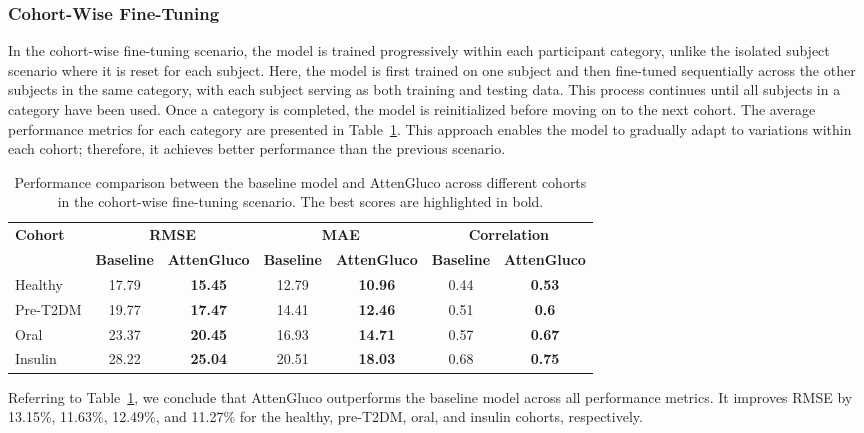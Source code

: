 \subsubsection{Cohort-Wise Fine-Tuning}
In the  cohort-wise fine-tuning scenario, the model is trained progressively within each participant category, unlike the isolated subject scenario where it is reset for each subject. Here, the model is first trained on one subject and then fine-tuned sequentially across the other subjects in the same category, with each subject serving as both training and testing data. This process continues until all subjects in a category have been used. Once a category is completed, the model is reinitialized before moving on to the next cohort. The average performance metrics for each category are presented in Table~\ref{tab:performance}. This approach enables the model to gradually adapt to variations within each cohort; therefore, it achieves better performance than the previous scenario.

\begin{table}[h]
    \centering
    \renewcommand{\arraystretch}{1.2} %
    \setlength{\tabcolsep}{6pt} %
    \captionsetup{justification=centering, font=small} %
    \caption{Performance comparison between the baseline model and AttenGluco across different cohorts in the cohort-wise fine-tuning scenario. The best scores are highlighted in bold.}
    \label{tab:performance}
    
    \begin{adjustbox}{max width=\columnwidth}
    \begin{tabular}{|l|cc|cc|cc|}
        \hline
        \multirow{2}{*}{\textbf{Cohort}} & \multicolumn{2}{c|}{\textbf{RMSE}} & \multicolumn{2}{c|}{\textbf{MAE}} & \multicolumn{2}{c|}{\textbf{Correlation}} \\
        & \textbf{Baseline} & \textbf{AttenGluco} & \textbf{Baseline} & \textbf{AttenGluco} & \textbf{Baseline} & \textbf{AttenGluco} \\
        \hline
        Healthy      & 17.79  & \textbf{15.45}   & 12.79  & \textbf{10.96}  & 0.44  & \textbf{0.53} \\
        Pre-T2DM & 19.77  & \textbf{17.47}   & 14.41  & \textbf{12.46}  & 0.51  & \textbf{0.6} \\
        Oral         & 23.37  & \textbf{20.45}   & 16.93  & \textbf{14.71}  & 0.57  & \textbf{0.67} \\
        Insulin      & 28.22  & \textbf{25.04}   & 20.51  & \textbf{18.03}  & 0.68  & \textbf{0.75} \\

        \hline
    \end{tabular}
    \end{adjustbox}
\end{table}
Referring to Table~\ref{tab:performance}, we conclude that AttenGluco outperforms the baseline model across all performance metrics. It improves RMSE by 13.15\%, 11.63\%, 12.49\%, and 11.27\% for the healthy, pre-T2DM, oral, and insulin cohorts, respectively.

